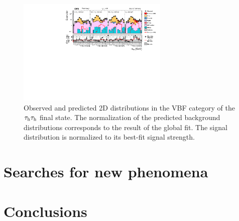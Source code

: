 \documentclass[10pt]{article}
\def\Acknowledgements{\bigskip  \bigskip \begin{center} \begin{large}
             \bf ACKNOWLEDGEMENTS \end{large}\end{center}}
\begin{document}
\begin{figure}[htb]
\centering
\includegraphics[height=2in]{figures/CMS-HIG-16-043__Figure_013__tauhtauh-VBF.pdf}
\caption{Observed and predicted 2D distributions in the VBF category of the
$\tau_{\rm h}\tau_{\rm h}$ final state. The normalization of the predicted
background distributions corresponds to the result of the global fit. The signal
distribution is normalized to its best-fit signal strength.
}
\label{fig:tauhtauh_VBF}
\end{figure}


\section{Searches for new phenomena}


\section{Conclusions}


\end{document}
